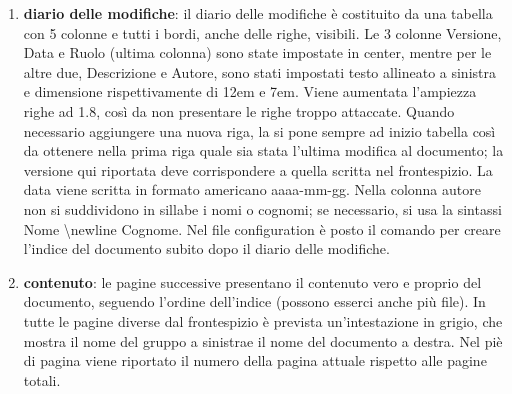 \begin{enumerate}
    \item \textbf{diario delle modifiche}:
            il diario delle modifiche è costituito da una tabella con 5 colonne e tutti i 
            bordi, anche delle righe, visibili. Le 3 colonne Versione, Data e Ruolo (ultima colonna) 
            sono state impostate in center, mentre per le altre due, Descrizione e Autore, sono stati impostati 
            testo allineato a sinistra e dimensione rispettivamente di 12em e 7em.
            Viene aumentata l'ampiezza righe ad 1.8, così da non presentare le righe troppo attaccate. \newline
            Quando necessario aggiungere una nuova riga, la si pone sempre ad inizio tabella così da ottenere 
            nella prima riga quale sia stata l'ultima modifica al documento; la versione qui riportata 
            deve corrispondere a quella scritta nel frontespizio. \newline
            La data viene scritta in formato americano aaaa-mm-gg. \newline
            Nella colonna autore non si suddividono in sillabe i nomi o cognomi; se necessario, si usa la 
            sintassi Nome \textbackslash newline Cognome. \newline
            Nel file configuration è posto il comando per creare l'indice del documento subito 
            dopo il diario delle modifiche.

    \item \textbf{contenuto}: 
            le pagine successive presentano il contenuto vero e proprio del documento, seguendo l'ordine
            dell'indice (possono esserci anche più file). In tutte le pagine diverse dal frontespizio è 
            prevista un'intestazione in grigio, che mostra il nome del gruppo a sinistrae il nome del 
            documento a destra.
            Nel piè di pagina viene riportato il numero della pagina attuale rispetto alle pagine totali.
\end{enumerate}

